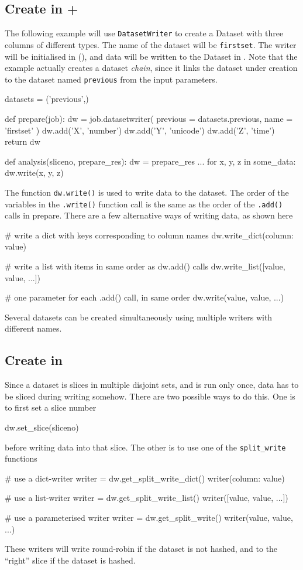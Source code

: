 \subsection{Create in \prepare + \analysis}
\label{sec:create_dataset_in_analysis}
The following example will use \texttt{DatasetWriter} to create a
Dataset with three columns of different types.  The name of the
dataset will be \texttt{firstset}.  The writer will be initialised
in \prepare(), and data will be written to the Dataset in \analysis.
Note that the example actually creates a dataset \emph{chain}, since
it links the dataset under creation to the dataset
named \texttt{previous} from the input parameters.
\begin{python}
datasets = ('previous',)

def prepare(job):
    dw = job.datasetwriter(
        previous = datasets.previous,
        name = 'firstset'
    )
    dw.add('X', 'number')
    dw.add('Y', 'unicode')
    dw.add('Z', 'time')
    return dw

def analysis(sliceno, prepare_res):
    dw = prepare_res
    ...
    for x, y, z in some_data:
        dw.write(x, y, z)
\end{python}
The function \texttt{dw.write()} is used to write data to the dataset.
The order of the variables in the \texttt{.write()} function call is
the same as the order of the \texttt{.add()} calls in prepare.  There
are a few alternative ways of writing data, as shown here
\begin{python}
    # write a dict with keys corresponding to column names
    dw.write_dict({column: value})

    # write a list with items in same order as dw.add() calls
    dw.write_list([value, value, ...])

    # one parameter for each .add() call, in same order
    dw.write(value, value, ...)
\end{python}
Several datasets can be created simultaneously using multiple writers
with different names.


\subsection{Create in \synthesis}
\label{sec:create_in_synthesis}
Since a dataset is slices in multiple disjoint sets, and \synthesis is
run only once, data has to be sliced during writing somehow.  There
are two possible ways to do this.  One is to first set a slice number
\begin{python}
dw.set_slice(sliceno)
\end{python}
before writing data into that slice.  The other is to use one of
the \texttt{split\_write} functions
\begin{python}
    # use a dict-writer
    writer = dw.get_split_write_dict()
    writer({column: value})

    # use a list-writer
    writer = dw.get_split_write_list()
    writer([value, value, ...])

    # use a parameterised writer
    writer = dw.get_split_write()
    writer(value, value, ...)
\end{python}
These writers will write round-robin if the dataset is not hashed, and
to the ``right'' slice if the dataset is hashed.


